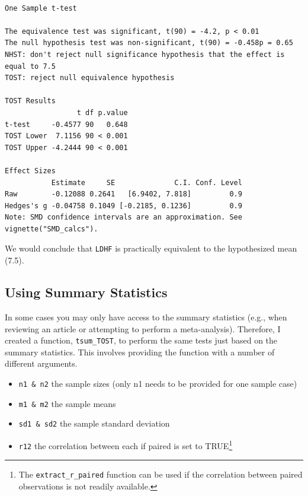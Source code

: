 \documentclass[
]{interact}
\newenvironment{Shaded}{\begin{snugshade}}{\end{snugshade}}
\newcommand{\AttributeTok}[1]{\textcolor[rgb]{0.40,0.45,0.13}{#1}}
\newcommand{\FloatTok}[1]{\textcolor[rgb]{0.68,0.00,0.00}{#1}}
\newcommand{\FunctionTok}[1]{\textcolor[rgb]{0.28,0.35,0.67}{#1}}
\newcommand{\NormalTok}[1]{\textcolor[rgb]{0.00,0.23,0.31}{#1}}
\newcommand{\OtherTok}[1]{\textcolor[rgb]{0.00,0.23,0.31}{#1}}
\newcommand{\SpecialCharTok}[1]{\textcolor[rgb]{0.37,0.37,0.37}{#1}}
\newcommand{\StringTok}[1]{\textcolor[rgb]{0.13,0.47,0.30}{#1}}
\providecommand{\tightlist}{%
  \setlength{\itemsep}{0pt}\setlength{\parskip}{0pt}}\usepackage{longtable,booktabs,array}
\begin{document}
\begin{Shaded}
\end{Shaded}

\begin{verbatim}

One Sample t-test

The equivalence test was significant, t(90) = -4.2, p < 0.01
The null hypothesis test was non-significant, t(90) = -0.458p = 0.65
NHST: don't reject null significance hypothesis that the effect is equal to 7.5 
TOST: reject null equivalence hypothesis

TOST Results 
                 t df p.value
t-test     -0.4577 90   0.648
TOST Lower  7.1156 90 < 0.001
TOST Upper -4.2444 90 < 0.001

Effect Sizes 
           Estimate     SE              C.I. Conf. Level
Raw        -0.12088 0.2641   [6.9402, 7.818]         0.9
Hedges's g -0.04758 0.1049 [-0.2185, 0.1236]         0.9
Note: SMD confidence intervals are an approximation. See vignette("SMD_calcs").
\end{verbatim}

We would conclude that \texttt{LDHF} is practically equivalent to the
hypothesized mean (7.5).

\newpage

\hypertarget{using-summary-statistics}{%
\subsection{Using Summary Statistics}\label{using-summary-statistics}}

In some cases you may only have access to the summary statistics (e.g.,
when reviewing an article or attempting to perform a meta-analysis).
Therefore, I created a function, \texttt{tsum\_TOST}, to perform the
same tests just based on the summary statistics. This involves providing
the function with a number of different arguments.

\begin{itemize}
\tightlist
\item
  \texttt{n1\ \&\ n2} the sample sizes (only n1 needs to be provided for
  one sample case)
\item
  \texttt{m1\ \&\ m2} the sample means
\item
  \texttt{sd1\ \&\ sd2} the sample standard deviation
\item
  \texttt{r12} the correlation between each if paired is set to
  TRUE\footnote{The \texttt{extract\_r\_paired} function can be used if
    the correlation between paired observations is not readily
    available.}
\end{itemize}
\end{document}
